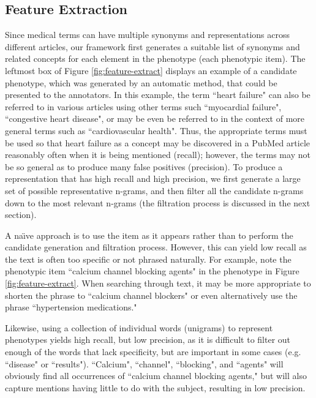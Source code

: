 \documentclass{sig-alternate-05-2015}
\begin{document}
\subsection{Feature Extraction}
Since medical terms can have multiple synonyms and representations across different articles, our framework first generates a suitable list of synonyms and related concepts for each element in the phenotype (each phenotypic item).
The leftmost box of Figure \ref{fig:feature-extract} displays an example of a candidate phenotype, which was generated by an automatic method, that could be presented to the annotators.
In this example, the term ``heart failure" can also be referred to in various articles using other terms such ``myocardial failure", ``congestive heart disease", or may be even be referred to in the context of more general terms such as ``cardiovascular health".
Thus, the appropriate terms must be used so that heart failure as a concept may be discovered in a PubMed article reasonably often when it is being mentioned (recall); however, the terms may not be so general as to produce many false positives (precision).
To produce a representation that has high recall and high precision, we first generate a large set of possible representative n-grams, and then filter all the candidate n-grams down to the most relevant n-grams (the filtration process is discussed in the next section).

A na\"{\i}ve approach is to use the item as it appears rather than to perform the candidate generation and filtration process.
However, this can yield low recall as the text is often too specific or not phrased naturally. 
For example, note the phenotypic item ``calcium channel blocking agents" in the phenotype in Figure \ref{fig:feature-extract}. 
When searching through text, it may be more appropriate to shorten the phrase to ``calcium channel blockers" or even alternatively use the phrase  ``hypertension medications." 

Likewise, using a collection of individual words (unigrams) to represent phenotypes yields high recall, but low precision, as it is difficult to filter out enough of the words that lack specificity, but are important in some cases (e.g. ``disease" or ``results").
``Calcium", ``channel", ``blocking", and ``agents" will obviously find all occurrences of ``calcium channel blocking agents," but will also capture mentions having little to do with the subject, resulting in low precision.
\end{document}
